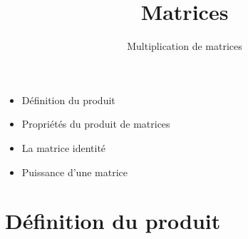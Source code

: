 








\title{{\bf Matrices}}
\subtitle{Multiplication de matrices}

\begin{frame}
  
  \debutmontitre

  \pause

{\footnotesize
\hfill
{}
\begin{minipage}{0.6\textwidth}
  \begin{itemize}
    \item<3-> Définition du produit
    \item<4-> Propriétés du produit de matrices
    \item<5-> La matrice identité
    \item<6-> Puissance d'une matrice   
  \end{itemize}
\end{minipage}
}

\end{frame}

\setcounter{framenumber}{0}


\section{Définition du produit}

